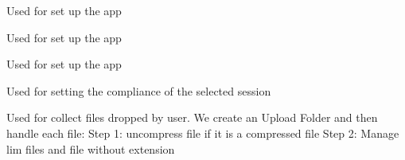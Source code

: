\documentclass[letterpaper,10pt,english]{sphinxmanual}
\begin{document}
\begin{fulllineitems}
\label{\detokenize{app:app.send_js}}
\pysigstartsignatures
{}
\pysigstopsignatures
\sphinxAtStartPar
Used for set up the app

\end{fulllineitems}


\begin{fulllineitems}
\label{\detokenize{app:app.send_static_files}}
\pysigstartsignatures
{}
\pysigstopsignatures
\sphinxAtStartPar
Used for set up the app

\end{fulllineitems}


\begin{fulllineitems}
\label{\detokenize{app:app.serve}}
\pysigstartsignatures
{}
\pysigstopsignatures
\sphinxAtStartPar
Used for set up the app

\end{fulllineitems}


\begin{fulllineitems}
\label{\detokenize{app:app.set_compl}}
\pysigstartsignatures
{}
\pysigstopsignatures
\sphinxAtStartPar
Used for setting the compliance of the selected session

\end{fulllineitems}


\begin{fulllineitems}
\label{\detokenize{app:app.upload}}
\pysigstartsignatures
{}
\pysigstopsignatures
\sphinxAtStartPar
Used for collect files dropped by user. We create an Upload Folder and then handle each file:
Step 1: uncompress file if it is a compressed file
Step 2: Manage lim files and file without extension

\end{fulllineitems}
\end{document}
